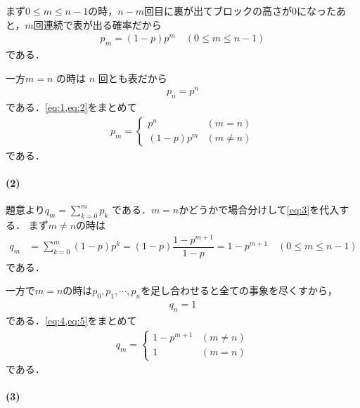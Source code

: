 \documentclass[../../main.tex]{subfiles}
\begin{document}
まず$0 \le m \le n-1$の時，$n-m$回目に裏が出てブロックの高さが$0$になったあと，$m$回連続で表が出る確率だから
\begin{align}
  p_m = (1-p) p^m \quad (0 \le m \le n-1) \label{eq:1}
\end{align}
である．

一方$m=n$ の時は $n$ 回とも表だから
\begin{align}
  p_n = p^{n} \label{eq:2}
\end{align}
である．\cref{eq:1,eq:2}をまとめて
\begin{align}
  p_m =
  \begin{cases}
    p^n & (m = n) \\
    (1-p) p^m & (m \neq n)
  \end{cases} \label{eq:3}
\end{align}
である．

\paragraph{(2)}

題意より$q_m = \sum_{k=0}^m p_k$ である．$m=n$かどうかで場合分けして\cref{eq:3}を代入する．
まず$m \neq n$の時は
\begin{align}
  q_m
  &= \sum_{k=0}^{m} (1-p) p^k
  = (1-p) \dfrac{1-p^{m+1}}{1-p}
  = 1-p^{m+1} \quad (0 \le m \le n-1) \label{eq:4}
\end{align}
である．

一方で$m=n$の時は$p_0,p_1,\cdots,p_n$を足し合わせると全ての事象を尽くすから，
\begin{align}
  q_n = 1 \label{eq:5}
\end{align}
である．\cref{eq:4,eq:5}をまとめて
\begin{align}
  q_m =
  \begin{cases}
    1 - p^{m+1} & (m \neq n) \\
    1 & (m = n)
  \end{cases} \label{eq:6}
\end{align}
である．

\paragraph{(3)}
\end{document}
